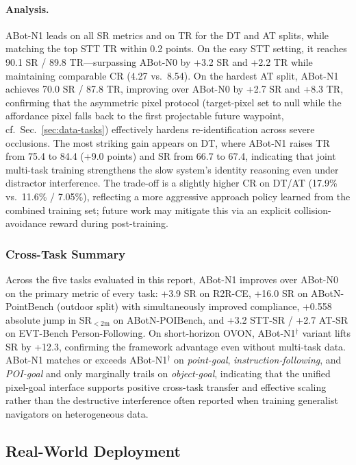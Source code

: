 \paragraph{Analysis.}
ABot-N1 leads on all SR metrics and on TR for the DT and AT
splits, while matching the top STT TR within 0.2 points. On the easy STT setting, it reaches 90.1 SR /
89.8 TR---surpassing ABot-N0 by +3.2 SR and +2.2 TR while
maintaining comparable CR (4.27 vs.\ 8.54). On the hardest AT split,
ABot-N1 achieves 70.0 SR / 87.8 TR,
improving over ABot-N0 by +2.7 SR and +8.3 TR, confirming that the
asymmetric pixel protocol (target-pixel set to null while the
affordance pixel falls back to the first projectable future waypoint,
cf.\ Sec.~\ref{sec:data-tasks}) effectively hardens re-identification
across severe occlusions. The most striking gain appears on DT, where
ABot-N1 raises TR from 75.4 to 84.4 (+9.0 points) and
SR from 66.7 to 67.4, indicating that joint multi-task
training strengthens the slow system's identity reasoning even
under distractor interference.
The trade-off is a slightly higher CR on DT/AT (17.9\% vs.\ 11.6\%
/ 7.05\%), reflecting a more aggressive approach policy learned from
the combined training set; future work may mitigate this via an explicit collision-avoidance reward during post-training.

\FloatBarrier
\subsubsection{Cross-Task Summary}
\label{sec:exp-summary}

Across the five tasks evaluated in this report,
ABot-N1 improves over ABot-N0 on the primary metric of
every task: +3.9 SR on R2R-CE,
+16.0 SR on ABotN-PointBench (outdoor split) with simultaneously improved
compliance, +0.558 absolute jump in SR$_{<2\mathrm{m}}$ on
ABotN-POIBench, and +3.2 STT-SR / +2.7 AT-SR on EVT-Bench
Person-Following. On short-horizon OVON, ABot-N1$^\dagger$
variant lifts SR by +12.3, confirming the framework advantage
even without multi-task data.
ABot-N1 matches or exceeds ABot-N1$^\dagger$
on \textit{point-goal}, \textit{instruction-following}, and \textit{POI-goal} and only
marginally trails on \textit{object-goal}, indicating that the
unified pixel-goal interface supports positive cross-task
transfer and effective scaling rather than the destructive
interference often reported when training generalist navigators
on heterogeneous data.

\subsection{Real-World Deployment}
\label{sec:exp-real}

